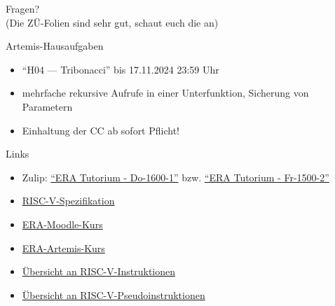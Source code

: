 \documentclass[
  german,            %
  aspectratio=169,    %
]{tumbeamer}
\begin{document}
\begin{frame}[c, fragile]{}{}
  \begin{center}
    \LARGE Fragen?\\
    \Large (Die ZÜ-Folien sind sehr gut, schaut euch die an)
  \end{center}
\end{frame}

\begin{frame}[c, fragile]{Artemis-Hausaufgaben}{}
  \begin{itemize}
    \item \enquote{H04 --- Tribonacci} bis 17.11.2024 23:59 Uhr
    \item mehrfache rekursive Aufrufe in einer Unterfunktion, Sicherung von Parametern
    \item Einhaltung der CC ab sofort Pflicht!
  \end{itemize}
\end{frame}

\begin{frame}[c, fragile]{Links}{}
  \begin{itemize}
    \item Zulip: \href{https://zulip.in.tum.de/#narrow/stream/2661-ERA-Tutorium---Do-1600-1}{\enquote{ERA Tutorium - Do-1600-1}}
          bzw. \href{https://zulip.in.tum.de/#narrow/stream/2675-ERA-Tutorium---Fr-1500-2 }{\enquote{ERA Tutorium - Fr-1500-2}}
    \item \href{https://riscv.org/wp-content/uploads/2017/05/riscv-spec-v2.2.pdf}{RISC-V-Spezifikation}
    \item \href{https://www.moodle.tum.de/course/view.php?id=100633}{ERA-Moodle-Kurs}
    \item \href{https://artemis.in.tum.de/courses/401}{ERA-Artemis-Kurs}
    \item \href{https://msyksphinz-self.github.io/riscv-isadoc/html/rvi.html}{Übersicht an RISC-V-Instruktionen}
    \item \href{https://github.com/riscv-non-isa/riscv-asm-manual/blob/main/src/asm-manual.adoc#a-listing-of-standard-risc-v-pseudoinstructions}{Übersicht an RISC-V-Pseudoinstruktionen}
  \end{itemize}
\end{frame}

\maketitle
\end{document}
